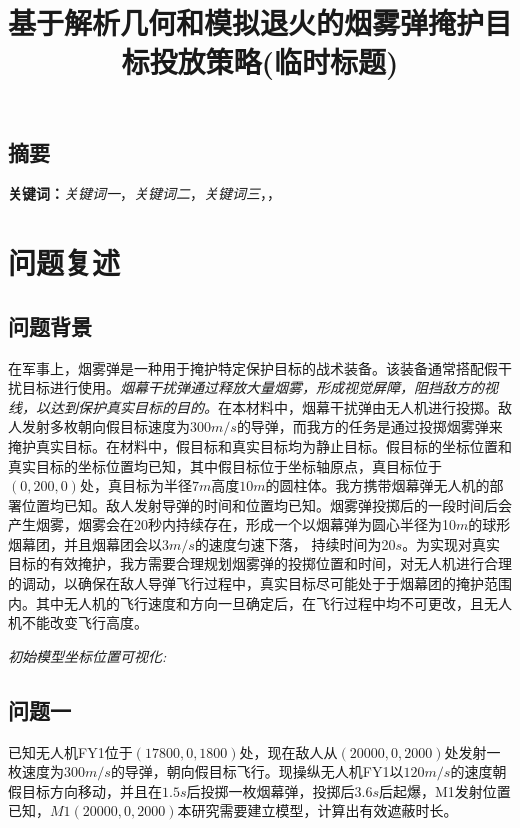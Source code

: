 \documentclass{article}
\title{\large 基于解析几何和模拟退火的烟雾弹掩护目标投放策略(临时标题)}
\date{}
\begin{document}
\maketitle
\begin{center}
\section*{摘要}
\end{center}
\vspace{-1em}


\noindent


\noindent
\textbf{关键词：}\textit{关键词一}，\textit{关键词二}，\textit{关键词三}，\textit{}，\textit{}



\section{问题复述}

\subsection{问题背景}

在军事上，烟雾弹是一种用于掩护特定保护目标的战术装备。该装备通常搭配假干扰目标进行使用。\textit{烟幕干扰弹通过释放大量烟雾，形成视觉屏障，阻挡敌方的视线，以达到保护真实目标的目的。}在本材料中，烟幕干扰弹由无人机进行投掷。敌人发射多枚朝向假目标速度为$300m/s$的导弹，而我方的任务是通过投掷烟雾弹来掩护真实目标。在材料中，假目标和真实目标均为静止目标。假目标的坐标位置和真实目标的坐标位置均已知，其中假目标位于坐标轴原点，真目标位于$(0,200,0)$处，真目标为半径$7m$高度$10m$的圆柱体。我方携带烟幕弹无人机的部署位置均已知。敌人发射导弹的时间和位置均已知。烟雾弹投掷后的一段时间后会产生烟雾，烟雾会在20秒内持续存在，形成一个以烟幕弹为圆心半径为10$m$的球形烟幕团，并且烟幕团会以$3 m/s$的速度匀速下落，
持续时间为20$s$。为实现对真实目标的有效掩护，我方需要合理规划烟雾弹的投掷位置和时间，对无人机进行合理的调动，以确保在敌人导弹飞行过程中，真实目标尽可能处于于烟幕团的掩护范围内。其中无人机的飞行速度和方向一旦确定后，在飞行过程中均不可更改，且无人机不能改变飞行高度。

\textit{初始模型坐标位置可视化:}

\subsection{问题一}

已知无人机FY1位于$(17800,0,1800)$处，现在敌人从$(20000,0,2000)$处发射一枚速度为$300m/s$的导弹，朝向假目标飞行。现操纵无人机FY1以$120m/s$的速度朝假目标方向移动，并且在$1.5s$后投掷一枚烟幕弹，投掷后$3.6s$后起爆，M1发射位置已知，$M1(20000,0,2000)$本研究需要建立模型，计算出有效遮蔽时长。
\end{document}
